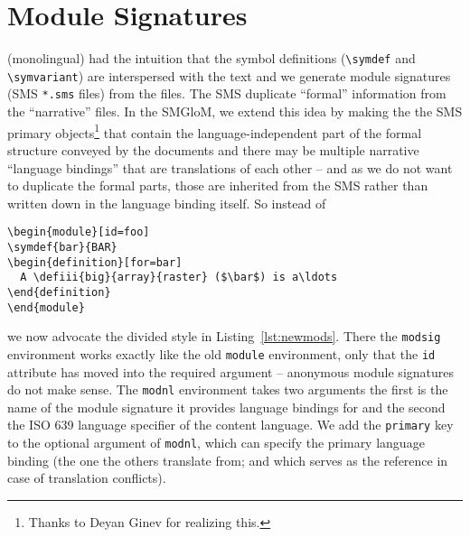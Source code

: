 \documentclass{bluenote}
\def\smglom{\textsf{SMGloM}\xspace}
\begin{document}
\section{\protect\sTeX Module Signatures}

(monolingual) \sTeX had the intuition that the symbol definitions (\lstinline|\symdef| and
\lstinline|\symvariant|) are interspersed with the text and we generate \sTeX module
signatures (SMS \lstinline|*.sms| files) from the \sTeX files. The SMS duplicate
``formal'' information from the ``narrative'' \sTeX files. In the \smglom, we extend this
idea by making the the SMS primary objects\footnote{Thanks to Deyan Ginev for realizing
  this.} that contain the language-independent part of the formal structure conveyed by
the \sTeX documents and there may be multiple narrative ``language bindings'' that are
translations of each other -- and as we do not want to duplicate the formal parts, those
are inherited from the SMS rather than written down in the language binding itself. So instead of 
\begin{lstlisting}[caption=Old-Style \protect\sTeX,label=lst:oldmods]
\begin{module}[id=foo]
\symdef{bar}{BAR}
\begin{definition}[for=bar]
  A \defiii{big}{array}{raster} ($\bar$) is a\ldots
\end{definition}
\end{module}
\end{lstlisting}

we now advocate the divided style in Listing~\ref{lst:newmods}. There the \lstinline|modsig| environment works exactly like the old
\lstinline|module| environment, only that the \lstinline|id| attribute has moved into the
required argument -- anonymous module signatures do not make sense. The
\lstinline|modnl| environment takes two arguments the first is the name of the module
signature it provides language bindings for and the second the ISO 639 language specifier
of the content language. We add the \lstinline|primary| key to the optional argument of
\lstinline|modnl|, which can specify the primary language binding (the one the others
translate from; and which serves as the reference in case of translation conflicts).
\end{document}
